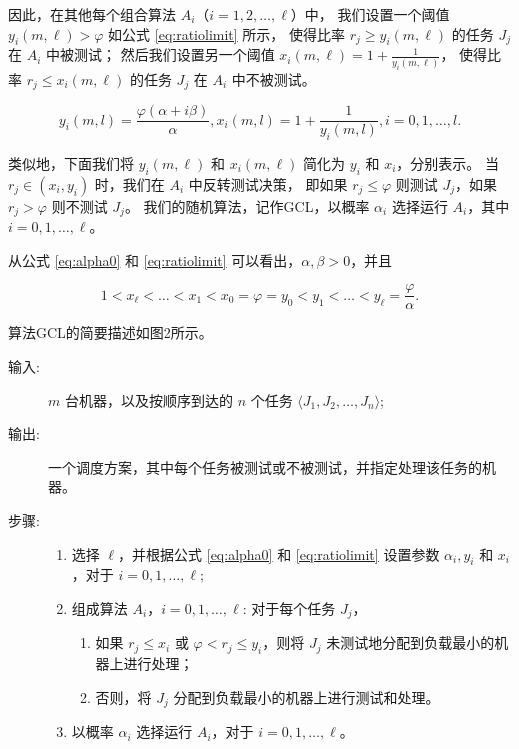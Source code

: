 因此，在其他每个组合算法 \( A_i \)（\( i = 1, 2, \ldots, \ell \)）中，
我们设置一个阈值 \( y_i(m, \ell) > \varphi \) 如公式 \ref{eq:ratiolimit} 所示，
使得比率 \( r_j \geq y_i(m, \ell) \) 的任务 \( J_j \) 在 \( A_i \) 中被测试；
然后我们设置另一个阈值 \( x_i(m, \ell) = 1 + \frac{1}{y_i(m, \ell)} \)，
使得比率 \( r_j \leq x_i(m, \ell) \) 的任务 \( J_j \) 在 \( A_i \) 中不被测试。

\begin{equation}
    y_i(m,l) = \dfrac{\varphi(\alpha+i\beta)}{\alpha},
    x_i(m,l) = 1 + \dfrac 1{y_i(m,l)},
    i = 0,1,\dots,l.
    \label{eq:ratiolimit}
\end{equation}

类似地，下面我们将 \( y_i(m, \ell) \) 和 \( x_i(m, \ell) \) 简化为 \( y_i \) 和 \( x_i \)，分别表示。
当 \( r_j \in (x_i, y_i) \) 时，我们在 \( A_i \) 中反转测试决策，
即如果 \( r_j \leq \varphi \) 则测试 \( J_j \)，如果 \( r_j > \varphi \) 则不测试 \( J_j \)。
我们的随机算法，记作GCL，以概率 \( \alpha_i \) 选择运行 \( A_i \)，其中 \( i = 0, 1, \ldots, \ell \)。

从公式 \ref{eq:alpha0} 和 \ref{eq:ratiolimit} 可以看出，\( \alpha, \beta > 0 \)，并且

\begin{equation}
    1 < x_\ell < \ldots < x_1 < x_0
    = \varphi = y_0 < y_1 < \ldots < y_\ell = \frac{\varphi}{\alpha}.
\end{equation}

算法GCL的简要描述如图2所示。

\begin{Thmbox}
    \begin{description}
        \item[输入:] \( m \) 台机器，以及按顺序到达的 \( n \) 个任务 \( \langle J_1, J_2, \ldots, J_n \rangle \);
        \item[输出:] 一个调度方案，其中每个任务被测试或不被测试，并指定处理该任务的机器。
        \item[步骤:]
        \begin{enumerate}
          \item 选择 \( \ell \)，并根据公式 \ref{eq:alpha0} 和 \ref{eq:ratiolimit} 设置参数 \( \alpha_i, y_i \) 和 \( x_i \)，对于 \( i = 0, 1, \ldots, \ell \);
          \item 组成算法 \( A_i \)，\( i = 0, 1, \ldots, \ell \): 对于每个任务 \( J_j \)，
            \begin{enumerate}
              \item 如果 \( r_j \leq x_i \) 或 \( \varphi < r_j \leq y_i \)，则将 \( J_j \) 未测试地分配到负载最小的机器上进行处理；
              \item 否则，将 \( J_j \) 分配到负载最小的机器上进行测试和处理。
            \end{enumerate}
          \item 以概率 \( \alpha_i \) 选择运行 \( A_i \)，对于 \( i = 0, 1, \ldots, \ell \)。
        \end{enumerate}
      \end{description}
\end{Thmbox}

